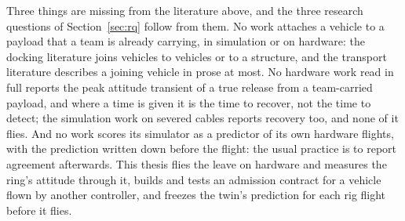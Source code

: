 Three things are missing from the literature above, and the three research questions of Section~\ref{sec:rq}
follow from them. No work attaches a vehicle to a payload that a team is already carrying, in simulation or on
hardware: the docking literature joins vehicles to vehicles or to a structure, and the transport literature
describes a joining vehicle in prose at most. No hardware work read in full reports the peak attitude transient of
a true release from a team-carried payload, and where a time is given it is the time to recover, not the time to
detect; the simulation work on severed cables reports recovery too, and none of it flies. And no work scores its
simulator as a predictor of its own hardware flights, with the prediction written down before the flight: the
usual practice is to report agreement afterwards. This thesis flies the leave on hardware and measures the ring's
attitude through it, builds and tests an admission contract for a vehicle flown by another controller, and freezes
the twin's prediction for each rig flight before it flies.
